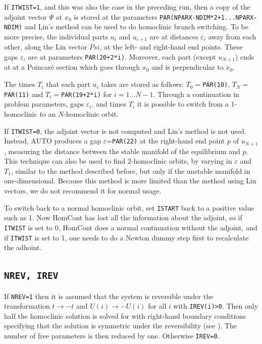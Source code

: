 \documentclass[12pt]{report}
\begin{document}
\begin{itemize}
If {\tt ITWIST=1}, and this was also the case in the preceding run,
then a copy of the adjoint vector $\Psi$ at $x_0$ is stored at the parameters
{\tt PAR(NPARX-NDIM*2+1...NPARX-NDIM)} and Lin's method can be used
to do homoclinic branch switching. To be more precise, the individual parts
$u_i$ and $u_{i+1}$ are at distances $\varepsilon_i$ away from each
other, along the Lin vector $Psi$, at the left- and right-hand end
points. These gaps $\varepsilon_i$ are at parameters
{\tt PAR(20+2*i)}. Moreover, each part (except $u_{N+1}$) ends at
at a Poincar\'e section which goes through $x_0$ and is perpendicular
to $\dot{x}_0$.

The times $T_i$ that each part $u_i$ takes are stored as follows: 
$T_0=${\tt PAR(10)}, $T_N=${\tt PAR(11)} and $T_i=${\tt PAR(19+2*i)}
for $i=1\ldots N-1$. Through a continuation in problem parameters,
gaps $\varepsilon_i$, and times $T_i$ 
it is possible to switch from a $1$-homoclinic to
an $N$-homoclinic orbit.

If {\tt ITWIST=0}, the adjoint vector is not computed and Lin's
method is not used. Instead, AUTO produces a gap
$\varepsilon$={\tt PAR(22)} at the right-hand end point $p$ of
$u_{N+1}$, measuring the distance between the stable manifold of the
equilibrium and $p$. This technique can also be used to find 2-homoclinic
orbits, by varying in $\varepsilon$ and $T_1$, similar to the method
described before, but only if the unstable manifold in
one-dimensional. Because this method is more limited than the method
using Lin vectors, we do not recommend it for normal usage.

To switch back to a normal homoclinic orbit, set {\tt ISTART} back to
a positive value such as 1. Now HomCont has lost all the information
about the adjoint, so if {\tt ITWIST} is set to 0, HomCont
does a normal continuation without the adjoint, and
if {\tt ITWIST} is set to 1, one needs to do a Newton dummy step
first to recalculate the adhoint.
\end{itemize}

\subsection{\tt NREV, IREV}  \label{sec:IREV}
If {\tt NREV=1} then it is assumed that
the system is reversible under the transformation 
$t \to -t$ and $U(i) \to -U(i)$ for all $i$ with 
{\tt IREV(i)>0}. Then only half the homoclinic solution is
solved for with right-hand boundary conditions specifying
that the solution is symmetric under the reversibility
(see ). The number of free parameters
is then reduced by one. Otherwise {\tt IREV=0}.
\end{document}
